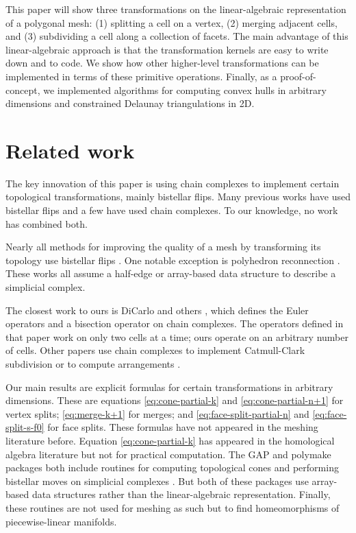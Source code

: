 \documentclass[twocolumn,leqno,twocolumn]{article}
\begin{document}
This paper will show three transformations on the linear-algebraic representation of a polygonal mesh: (1) splitting a cell on a vertex, (2) merging adjacent cells, and (3) subdividing a cell along a collection of facets.
The main advantage of this linear-algebraic approach is that the transformation kernels are easy to write down and to code.
We show how other higher-level transformations can be implemented in terms of these primitive operations.
Finally, as a proof-of-concept, we implemented algorithms for computing convex hulls in arbitrary dimensions and constrained Delaunay triangulations in 2D.



\section{Related work}

The key innovation of this paper is using chain complexes to implement certain topological transformations, mainly bistellar flips.
Many previous works have used bistellar flips and a few have used chain complexes.
To our knowledge, no work has combined both.

Nearly all methods for improving the quality of a mesh by transforming its topology use bistellar flips \cite{freitag1997tetrahedral, klingner2008aggressive, misztal2009tetrahedral, hu2018tetrahedral}.
One notable exception is polyhedron reconnection \cite{marot2020reviving}.
These works all assume a half-edge or array-based data structure to describe a simplicial complex.

The closest work to ours is DiCarlo and others \cite{dicarlo2007solid}, which defines the Euler operators and a bisection operator on chain complexes.
The operators defined in that paper work on only two cells at a time; ours operate on an arbitrary number of cells.
Other papers use chain complexes to implement Catmull-Clark subdivision \cite{mueller2017ternary} or to compute arrangements \cite{paoluzzi2020topological}.

Our main results are explicit formulas for certain transformations in arbitrary dimensions.
These are equations \eqref{eq:cone-partial-k} and \eqref{eq:cone-partial-n+1} for vertex splits; \eqref{eq:merge-k+1} for merges; and \eqref{eq:face-split-partial-n} and \eqref{eq:face-split-s-f0} for face splits.
These formulas have not appeared in the meshing literature before.
Equation \eqref{eq:cone-partial-k} has appeared in the homological algebra literature \cite{gelfand1994homological} but not for practical computation.
The GAP and polymake packages both include routines for computing topological cones and performing bistellar moves on simplicial complexes \cite{gawrilow2000polymake, bjorner2000simplicial, effenberger2011simpcomp}.
But both of these packages use array-based data structures rather than the linear-algebraic representation.
Finally, these routines are not used for meshing as such but to find homeomorphisms of piecewise-linear manifolds.
\end{document}
